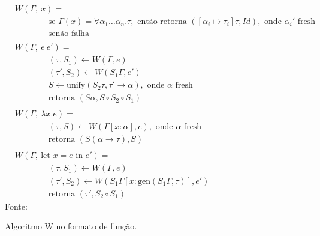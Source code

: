 \begin{figure}[ht!]
  \caption{Algoritmo W no formato de função.}
  \centering
  \begin{align*}
     & W(\Gamma,\ x)                                       =
    \\
     & \qquad{}\qquad{}\text{se } \Gamma(x) = \forall \alpha_1 \ldots \alpha_n . \tau, \text{ então retorna } ([\alpha_i \mapsto \tau_i] \tau, Id), \text{ onde } \alpha_i' \text{ fresh} \\
     & \qquad{}\qquad{}\text{senão falha}
    \\
    \\
     & W(\Gamma,\ e\  e')                                =                                                                                                                                \\
     & \qquad{}\qquad{}(\tau, S_1) \leftarrow W(\Gamma, e)                                                                                                                                \\
     & \qquad{}\qquad{}(\tau', S_2) \leftarrow W(S_1 \Gamma, e')                                                                                                                          \\
     & \qquad{}\qquad{}S \leftarrow \text{unify}(S_2 \tau, \tau' \to \alpha), \text{ onde } \alpha \text{ fresh}                                                                          \\
     & \qquad{}\qquad{}\text{retorna } (S \alpha, S \circ S_2 \circ S_1)
    \\
    \\
     & W(\Gamma,\ \lambda x . e)                          =                                                                                                                                \\
     & \qquad{}\qquad{}(\tau, S) \leftarrow W(\Gamma[x : \alpha], e), \text{ onde } \alpha \text{ fresh}                                                                                  \\
     & \qquad{}\qquad{}\text{retorna } (S (\alpha \to \tau), S)
    \\
    \\
     & W(\Gamma,\ \text{let } x = e \text{ in } e') =                                                                                                                                \\
     & \qquad{}\qquad{}(\tau, S_1) \leftarrow W(\Gamma, e)                                                                                                                                \\
     & \qquad{}\qquad{}(\tau', S_2) \leftarrow W(S_1 \Gamma[x : \text{gen}(S_1 \Gamma, \tau)], e')                                                                                        \\
     & \qquad{}\qquad{}\text{retorna } (\tau', S_2 \circ S_1)
  \end{align*}
  \small{Fonte:~\cite{CASTRO2019}}\label{fig:algoritmo-w}
\end{figure}
